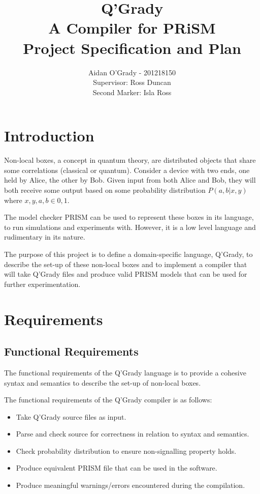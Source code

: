 \documentclass[11pt, a4paper]{article}
\begin{document}
\title{Q'Grady \\A Compiler for PRiSM \\
\large{Project Specification and Plan}}
\author{Aidan O'Grady - 201218150\\Supervisor: Ross Duncan\\Second Marker: Isla
Ross}
\date{}
\maketitle

\section{Introduction} %
\label{sec:introduction}
Non-local boxes, a concept in quantum theory, are distributed objects that share
some correlations (classical or quantum). Consider a device with two ends, one
held by Alice, the other by Bob. Given input from both Alice and Bob, they will
both receive some output based on some probability distribution \(P(a,b|x,y)\)
where \(x,y,a,b \in {0,1}\).

The model checker PRISM can be used to represent these boxes in its language,
to run simulations and experiments with. However, it is a low level language and
rudimentary in its nature.

The purpose of this project is to define a domain-specific language, Q'Grady, to
describe the set-up of these non-local boxes and to implement a compiler that
will take Q'Grady files and produce valid PRISM models that can be used for
further experimentation.


\section{Requirements} %
\label{sec:requirements}
\subsection{Functional Requirements} %
\label{sub:functional_requirements}
The functional requirements of the Q'Grady language is to provide a cohesive
syntax and semantics to describe the set-up of non-local boxes.

The functional requirements of the Q'Grady compiler is as follows:
\begin{itemize}
    \item Take Q'Grady source files as input.
    \item Parse and check source for correctness in relation to syntax and
    semantics.
    \item Check probability distribution to ensure non-signalling property
    holds.
    \item Produce equivalent PRISM file that can be used in the software.
    \item Produce meaningful warnings/errors encountered during the
    compilation.
\end{itemize}
\end{document}
